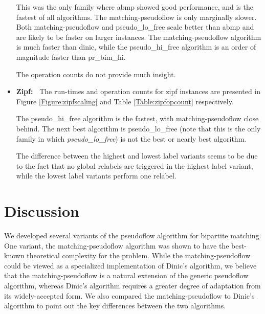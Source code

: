 \documentclass{article}
\begin{document}
\begin{itemize}
This was the only family where {\sf abmp} showed good performance, and is the fastest of all algorithms.  The {\sf matching-pseudoflow} is only marginally slower.  Both {\sf matching-pseudoflow} and {\sf pseudo\_lo\_free} scale better than {\sf abmp} and are likely to be faster on larger instances.   The {\sf matching-pseudoflow} algorithm is much faster than {\sf dinic}, while the {\sf pseudo\_hi\_free} algorithm is an order of magnitude faster than {\sf pr\_bim\_hi}.

The operation counts do not provide much insight.

\item {\bf Zipf:~}  The run-times and operation counts for {\sf zipf} instances are presented in Figure \ref{Figure:zipfscaling} and Table \ref{Table:zipfopcount} respectively.

The {\sf pseudo\_hi\_free} algorithm is the fastest, with {\sf matching-pseudoflow} close behind.  The next best algorithm is {\sf pseudo\_lo\_free} (note that this is the only family in which {\sl pseudo\_lo\_free}) is not the best or nearly best algorithm.

The difference between the highest and lowest label variants seems to be due to the fact that no global relabels are triggered in the highest label variant, while the lowest label variants perform one relabel.
\end{itemize}
\section{Discussion}

We developed several variants of the pseudoflow algorithm for bipartite matching. One variant, the {\sf matching-pseudoflow} algorithm was shown to have the best-known theoretical complexity for the problem.  While the {\sf  matching-pseudoflow} could be viewed as a specialized implementation of Dinic's algorithm, we believe that the {\sf matching-pseudoflow} is a natural extension of the generic pseudoflow algorithm, whereas Dinic's algorithm requires a greater degree of adaptation from its widely-accepted form.  We also compared the {\sf matching-pseudoflow} to Dinic's algorithm to point out the key differences between the two algorithms. 
\end{document}

